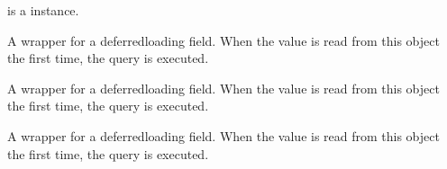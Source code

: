 \documentclass[letterpaper,10pt,french]{sphinxmanual}
\begin{document}
\begin{fulllineitems}
\begin{fulllineitems}
\sphinxAtStartPar
{} is a  instance.

\end{fulllineitems}


\begin{fulllineitems}
\label{\detokenize{main/model:main.models.Frais.annee_universitaire_id}}
\pysigstartsignatures
{}
\pysigstopsignatures
\end{fulllineitems}


\begin{fulllineitems}
\label{\detokenize{main/model:main.models.Frais.id}}
\pysigstartsignatures
{}
\pysigstopsignatures
\sphinxAtStartPar
A wrapper for a deferred\sphinxhyphen{}loading field. When the value is read from this
object the first time, the query is executed.

\end{fulllineitems}


\begin{fulllineitems}
\label{\detokenize{main/model:main.models.Frais.montant_inscription}}
\pysigstartsignatures
{}
\pysigstopsignatures
\sphinxAtStartPar
A wrapper for a deferred\sphinxhyphen{}loading field. When the value is read from this
object the first time, the query is executed.

\end{fulllineitems}


\begin{fulllineitems}
\label{\detokenize{main/model:main.models.Frais.montant_scolarite}}
\pysigstartsignatures
{}
\pysigstopsignatures
\sphinxAtStartPar
A wrapper for a deferred\sphinxhyphen{}loading field. When the value is read from this
object the first time, the query is executed.


\end{fulllineitems}
\end{fulllineitems}
\end{document}
